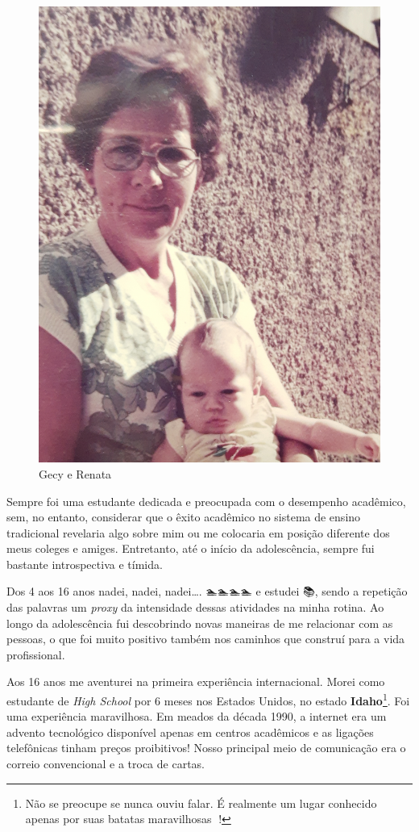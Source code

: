 \documentclass[
]{book}
\begin{document}
\begin{figure}
\includegraphics[width=1\linewidth]{img/gecy} \caption{Gecy e Renata}\label{fig:gecy}
\end{figure}

Sempre foi uma estudante dedicada e preocupada com o desempenho acadêmico, sem, no entanto, considerar que o êxito acadêmico no sistema de ensino tradicional revelaria algo sobre mim ou me colocaria em posição diferente dos meus coleges e amiges. Entretanto, até o início da adolescência, sempre fui bastante introspectiva e tímida.

Dos 4 aos 16 anos nadei, nadei, nadei\ldots. 🏊🏊🏊🏊 e estudei 📚, sendo a repetição das palavras um \emph{proxy} da intensidade dessas atividades na minha rotina. Ao longo da adolescência fui descobrindo novas maneiras de me relacionar com as pessoas, o que foi muito positivo também nos caminhos que construí para a vida profissional.

Aos 16 anos me aventurei na primeira experiência internacional. Morei como estudante de \emph{High School} por 6 meses nos Estados Unidos, no estado \textbf{Idaho}\footnote{Não se preocupe se nunca ouviu falar. É realmente um lugar conhecido apenas por suas batatas maravilhosas 🥔!}. Foi uma experiência maravilhosa. Em meados da década 1990, a internet era um advento tecnológico disponível apenas em centros acadêmicos e as ligações telefônicas tinham preços proibitivos! Nosso principal meio de comunicação era o correio convencional e a troca de cartas.
\end{document}
